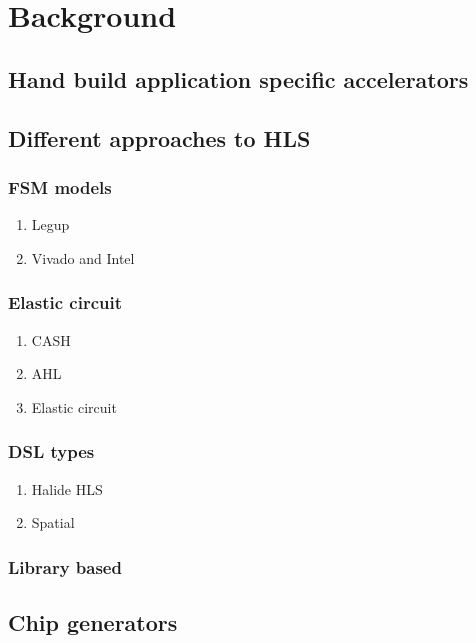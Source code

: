 
\chapter{Background}
\label{background}




% 

\section{Hand build application specific accelerators}

\section{Different approaches to HLS}
\subsection{FSM models}
\begin{enumerate}
    \item Legup
    \item Vivado and Intel
\end{enumerate}

\subsection{Elastic circuit}

\begin{enumerate}
    \item CASH
    \item AHL
    \item Elastic circuit
\end{enumerate}

\subsection{DSL types}
\begin{enumerate}
    \item Halide HLS
    \item Spatial
\end{enumerate}

\subsection{Library based}


\section{Chip generators}

